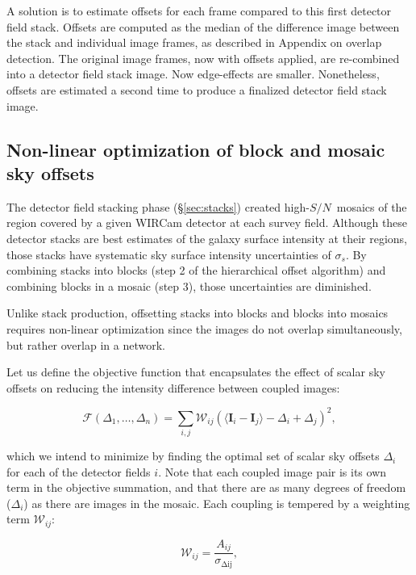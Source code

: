 \documentclass[iop]{emulateapj}
\newcommand{\vect}[1]{\boldsymbol{#1}} %
\newcommand{\sn}{\ensuremath{S/N}} %
\newcommand{\todo}[1]{\textcolor{RedOrange}{#1}} %
\begin{document}
A solution is to estimate offsets for each frame compared to this first detector field stack. Offsets are computed as the median of the difference image between the stack and individual image frames, as described in \todo{Appendix on overlap detection}. The original image frames, now with offsets applied, are re-combined into a detector field stack image. Now edge-effects are smaller. Nonetheless, offsets are estimated a second time to produce a finalized detector field stack image.

\subsection{Non-linear optimization of block and mosaic sky offsets}

The detector field stacking phase (\S \ref{sec:stacks}) created high-\sn\ mosaics of the region covered by a given WIRCam detector at each survey field. Although these detector stacks are best estimates of the galaxy surface intensity at their regions, those stacks have systematic sky surface intensity uncertainties of $\sigma_s$. By combining stacks into blocks (step 2 of the hierarchical offset algorithm) and combining blocks in a mosaic (step 3), those uncertainties are diminished.

Unlike stack production, offsetting stacks into blocks and blocks into mosaics requires non-linear optimization since the images do not overlap simultaneously, but rather overlap in a network.

Let us define the objective function that encapsulates the effect of scalar sky offsets on reducing the intensity difference between coupled images:

\begin{equation}
    \mathcal{F} \left(\Delta_1,\ldots,\Delta_n \right) = \sum_{i,j} \mathcal{W}_{ij} \left( \langle \vect{I}_i - \vect{I}_j \rangle - \Delta_i + \Delta_j \right)^2,
    \label{eq:objf}
\end{equation}

\noindent which we intend to minimize by finding the optimal set of scalar sky offsets $\Delta_i$ for each of the detector fields $i$. Note that each coupled image pair is its own term in the objective summation, and that there are as many degrees of freedom ($\Delta_i$) as there are images in the mosaic. Each coupling is tempered by a weighting term $\mathcal{W}_{ij}$:

\begin{equation}
    \mathcal{W}_{ij} = \frac{A_{ij}}{\sigma_{\mathrm{\Delta ij}}},
\end{equation}
\end{document}
